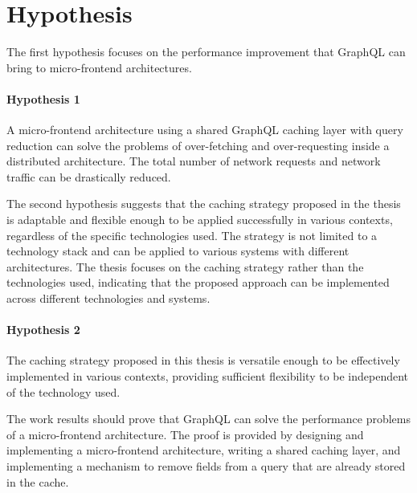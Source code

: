 \section{Hypothesis}\label{section:introduction:hypothesis}

The first hypothesis focuses on the performance improvement that GraphQL can bring to micro-frontend architectures.

\paragraph{Hypothesis 1} 
A micro-frontend architecture using a shared GraphQL caching layer with query reduction can solve the problems of over-fetching and over-requesting inside a distributed architecture. The total number of network requests and network traffic can be drastically reduced.

\bigskip

\noindent The second hypothesis suggests that the caching strategy proposed in the thesis is adaptable and flexible enough to be applied successfully in various contexts, regardless of the specific technologies used. The strategy is not limited to a technology stack and can be applied to various systems with different architectures. The thesis focuses on the caching strategy rather than the technologies used, indicating that the proposed approach can be implemented across different technologies and systems.

\paragraph{Hypothesis 2}
The caching strategy proposed in this thesis is versatile enough to be effectively implemented in various contexts, providing sufficient flexibility to be independent of the technology used.

\bigskip

\noindent The work results should prove that GraphQL can solve the performance problems of a micro-frontend architecture. The proof is provided by designing and implementing a micro-frontend architecture, writing a shared caching layer, and implementing a mechanism to remove fields from a query that are already stored in the cache.
